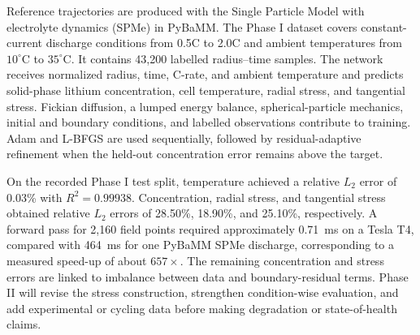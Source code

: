 \documentclass[14pt,a4paper,oneside]{extreport}
\begin{document}
Reference trajectories are produced with the Single Particle Model with electrolyte dynamics (SPMe) in PyBaMM. The Phase I dataset covers constant-current discharge conditions from 0.5C to 2.0C and ambient temperatures from $10^{\circ}$C to $35^{\circ}$C. It contains 43,200 labelled radius--time samples. The network receives normalized radius, time, C-rate, and ambient temperature and predicts solid-phase lithium concentration, cell temperature, radial stress, and tangential stress. Fickian diffusion, a lumped energy balance, spherical-particle mechanics, initial and boundary conditions, and labelled observations contribute to training. Adam and L-BFGS are used sequentially, followed by residual-adaptive refinement when the held-out concentration error remains above the target.

On the recorded Phase I test split, temperature achieved a relative $L_2$ error of 0.03\% with $R^2=0.99938$. Concentration, radial stress, and tangential stress obtained relative $L_2$ errors of 28.50\%, 18.90\%, and 25.10\%, respectively. A forward pass for 2,160 field points required approximately 0.71~ms on a Tesla T4, compared with 464~ms for one PyBaMM SPMe discharge, corresponding to a measured speed-up of about $657\times$. The remaining concentration and stress errors are linked to imbalance between data and boundary-residual terms. Phase II will revise the stress construction, strengthen condition-wise evaluation, and add experimental or cycling data before making degradation or state-of-health claims.

\clearpage
\tableofcontents
\clearpage
\listoftables
{}
\clearpage
\listoffigures
{}
\clearpage
\end{document}
